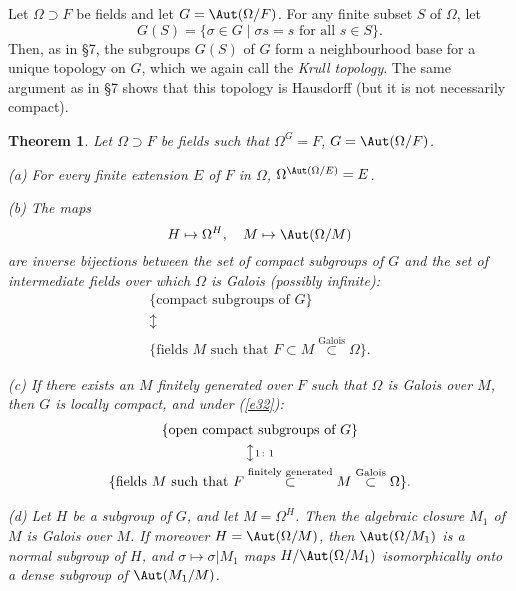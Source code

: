 \documentclass[a4paper,11pt,final,openany]{memoir}
\newtheorem{theorem}[X]{Theorem}
\theoremstyle{nonumberplain}
\begin{document}
\addtocounter{X}{1}

Let $\Omega\supset F$ be fields and let $G{}=\Aut(\Omega/F)$. For any finite
subset $S$ of $\Omega$, let%
\[
G{}(S)=\{\sigma\in G{}\mid\sigma s=s\text{ for all }s\in S\}\text{.}%
\]
Then, as in \S 7, the subgroups $G{}(S)$ of $G{}$ form a neighbourhood base
for a unique topology on $G{}$, which we again call the%
\emph{Krull topology}. The same argument as in \S 7 shows that this topology
is Hausdorff (but it is not necessarily compact).

\begin{theorem}
\label{te22}Let $\Omega\supset F$ be fields such that $\Omega^{G{}}=F$,
$G=\Aut(\Omega/F)$.

(a) For every finite extension $E$ of $F$ in $\Omega$, $\Omega^{\Aut(\Omega
/E)}=E$.

(b) The maps%
\begin{equation}
H\mapsto\Omega^{H},\quad M\mapsto\Aut(\Omega/M) \label{e32}%
\end{equation}
are inverse bijections between the set of compact subgroups of $G$ and the set
of intermediate fields over which $\Omega$ is Galois (possibly infinite):%
\begin{gather*}
\{\text{compact subgroups of }G\}\\
\updownarrow\\
\{\text{fields }M\text{ such
that }F\subset M\overset{\text{Galois}}{\subset}\Omega\}.
\end{gather*}


(c) If there exists an $M$ finitely generated over $F$ such that $\Omega$ is
Galois over $M$, then $G$ is locally compact, and under (\ref{e32}):%
\begin{gather*}
\{\text{open compact subgroups of }G\}\\
\big\updownarrow {\scriptstyle 1\colon1}\\
\{\text{fields }M\text{ such that }F\overset{\text{finitely generated}%
}{\subset}M\overset{\text{Galois}}{\subset}\Omega\}.
\end{gather*}


(d) Let $H$ be a subgroup of $G$, and let $M=\Omega^{H}$. Then the algebraic
closure $M_{1}$ of $M$ is Galois over $M$. If moreover $H=\Aut(\Omega/M)$,
then $\Aut(\Omega/M_{1})$ is a normal subgroup of $H$, and $\sigma
\mapsto\sigma|M_{1}$ maps $H/\Aut(\Omega/M_{1})$ isomorphically onto a dense
subgroup of $\Aut(M_{1}/M)$.
\end{theorem}
\end{document}
